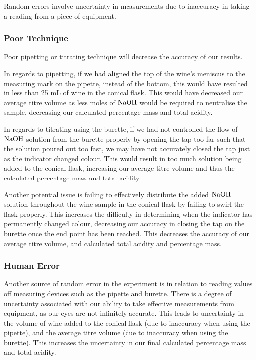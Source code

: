 \documentclass[a4paper,11pt]{article}
\begin{document}
Random errors involve uncertainty in measurements due to inaccuracy in taking a
reading from a piece of equipment.


\subsubsection{Poor Technique}

Poor pipetting or titrating technique will decrease the accuracy of our results.

In regards to pipetting, if we had aligned the top of the wine's meniscus
to the measuring mark on the pipette, instead of the bottom, this would have resulted in less than 25 mL
of wine in the conical flask. This would have decreased our average titre
volume as less moles of $\ce{NaOH}$ would be required to neutralise the sample,
decreasing our calculated percentage mass and total acidity.

In regards to titrating using the burette, if we had not controlled the flow of
$\ce{NaOH}$ solution from the burette properly by opening the tap too far such
that the solution poured out too fast, we
may have not accurately closed the tap just as the indicator changed colour.
This would result in too much solution being added to the conical flask,
increasing our average titre volume and thus the calculated percentage mass and
total acidity.

Another potential issue is failing to effectively distribute the added $\ce{NaOH}$
solution throughout the wine sample in the conical flask by failing to swirl the flask properly.
This increases the difficulty in determining when the indicator has permanently
changed colour, decreasing our accuracy in closing the tap on the burette once
the end point has been reached. This decreases the accuracy of our average
titre volume, and calculated total acidity and percentage mass.


\subsubsection{Human Error}

Another source of random error in the experiment is in relation to reading
values off measuring devices such as the pipette and burette. There is a degree
of uncertainty associated with our ability to take effective measurements from
equipment, as our eyes are not infinitely accurate. This leads to uncertainty
in the volume of wine added to the conical flask (due to inaccuracy when using
the pipette), and the average titre volume (due to inaccuracy when using the
burette). This increases the uncertainty in our final calculated percentage
mass and total acidity.
\end{document}
